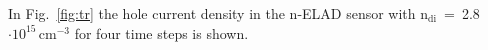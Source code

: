 \documentclass[a4paper,11pt]{article}
\begin{document}
In Fig.~\ref{fig:tr} the hole current density in the n-ELAD sensor with $\mathrm{n_{di}}$~=~2.8$\mathrm{\cdot10^{15}\,cm^{-3}}$ for four time steps is shown.
\begin{figure}[h]
\begin{center}
\begin{minipage}[h]{0.17\linewidth}
\end{minipage}
\hfill 
\begin{minipage}[h]{0.17\linewidth}
\end{minipage}
\hfill 
\begin{minipage}[h]{0.17\linewidth}

\end{minipage}
\end{center}
\end{figure}
\end{document}
